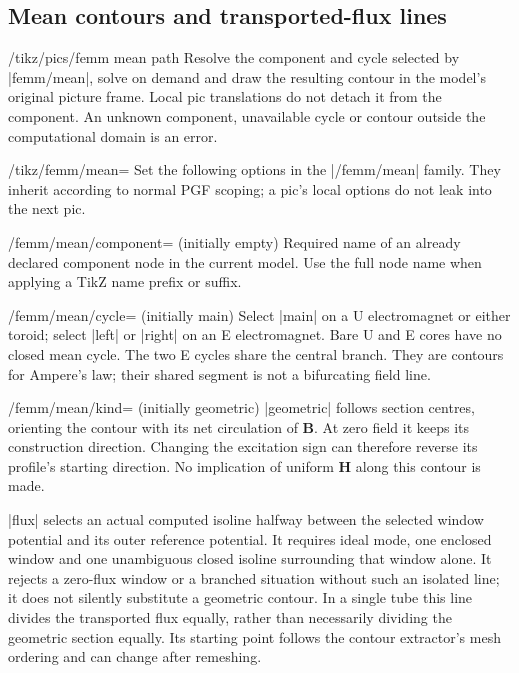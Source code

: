 \subsection{Mean contours and transported-flux lines}
\begin{key}{/tikz/pics/femm mean path}
Resolve the component and cycle selected by |femm/mean|, solve on demand and
draw the resulting contour in the model's original picture frame. Local pic
translations do not detach it from the component. An unknown component,
unavailable cycle or contour outside the computational domain is an error.
\end{key}
\begin{key}{/tikz/femm/mean=}
Set the following options in the |/femm/mean| family. They inherit according
to normal PGF scoping; a pic's local options do not leak into the next pic.
\end{key}
\begin{key}{/femm/mean/component= (initially empty)}
Required name of an already declared component node in the current model.
Use the full node name when applying a TikZ name prefix or suffix.
\end{key}
\begin{key}{/femm/mean/cycle= (initially main)}
Select |main| on a U electromagnet or either toroid; select |left| or |right|
on an E electromagnet. Bare U and E cores have no closed mean cycle.
The two E cycles share the central branch. They are contours for Ampere's law;
their shared segment is not a bifurcating field line.
\end{key}
\begin{key}{/femm/mean/kind= (initially geometric)}
|geometric| follows section centres, orienting the contour with its net
circulation of $\mathbf B$. At zero field it keeps its construction direction.
Changing the excitation sign can therefore reverse its profile's starting
direction. No implication of uniform $\mathbf H$ along this contour is made.

|flux| selects an actual computed isoline halfway between the selected window
potential and its outer reference potential. It requires ideal mode, one
enclosed window and one unambiguous closed isoline surrounding that window
alone. It rejects a zero-flux window or a branched situation without such an
isolated line; it does not silently substitute a geometric contour. In a
single tube this line divides the transported flux equally, rather than
necessarily dividing the geometric section equally. Its starting point follows
the contour extractor's mesh ordering and can change after remeshing.
\end{key}
